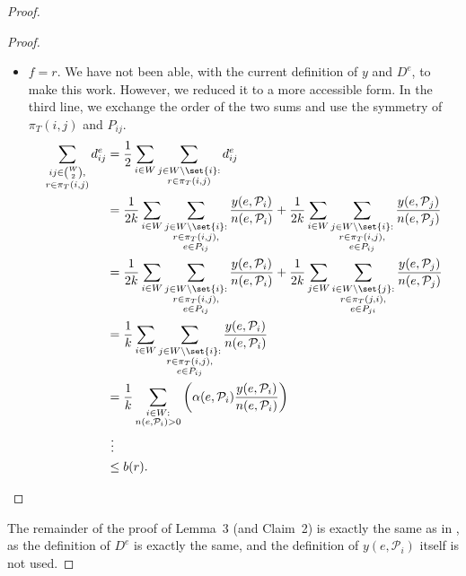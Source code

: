 \documentclass[11pt]{article}
\theoremstyle{definition}
\begin{document}
\begin{proof}
\begin{proof}
\begin{itemize}
                \item $f = r$.
                We have not been able, with the current definition of $y$ and $D^e$, to make this work.
                However, we reduced it to a more accessible form.
                In the third line, we exchange the order of the two sums and use the symmetry of $\pi_T(i, j)$ and $P_{ij}$.
                \[
                    \begin{split}
                        \sum_{\substack{ij \in \binom{W}{2},\\r \in \pi_T(i,j)}} d^e_{ij} &= \frac 1 2 \sum_{i \in W} \sum_{\substack{j \in W \setminus \set{i}:\\r \in \pi_T(i,j)}} d^e_{ij} \\
                        &= \frac{1}{2k} \sum_{i \in W} \sum_{\substack{j \in W \setminus \set{i}:\\r \in \pi_T(i,j),\\e \in P_{ij}}} \frac{y(e, \mathcal P_i)}{n(e, \mathcal P_i)} + \frac{1}{2k} \sum_{i \in W} \sum_{\substack{j \in W \setminus \set{i}:\\r \in \pi_T(i,j),\\e \in P_{ij}}} \frac{y(e, \mathcal P_j)}{n(e, \mathcal P_j)} \\
                        &= \frac{1}{2k} \sum_{i \in W} \sum_{\substack{j \in W \setminus \set{i}:\\r \in \pi_T(i,j),\\e \in P_{ij}}} \frac{y(e, \mathcal P_i)}{n(e, \mathcal P_i)} + \frac{1}{2k} \sum_{j \in W} \sum_{\substack{i \in W \setminus \set{j}:\\r \in \pi_T(j,i),\\e \in P_{ji}}} \frac{y(e, \mathcal P_j)}{n(e, \mathcal P_j)} \\
                        &= \frac{1}{k} \sum_{i \in W} \sum_{\substack{j \in W \setminus \set{i}:\\r \in \pi_T(i,j),\\e \in P_{ij}}} \frac{y(e, \mathcal P_i)}{n(e, \mathcal P_i)} \\
                        &= \frac{1}{k} \sum_{\substack{i \in W:\\n(e, \mathcal P_i) > 0}} \left( \alpha(e, \mathcal P_i) \frac{y(e, \mathcal P_i)}{n(e, \mathcal P_i)} \right) \\
                        &\ \vdots\\
                        &\le b(r).
                    \end{split}
                \] \qedhere
            \end{itemize}

        \end{proof}
        The remainder of the proof of Lemma~3 (and Claim~2) is exactly the same as in \cite{grandoni2008short}, as the definition of $D^e$ is exactly the same, and the definition of $y(e, \mathcal P_i)$ itself is not used.
    \end{proof}
\end{document}
